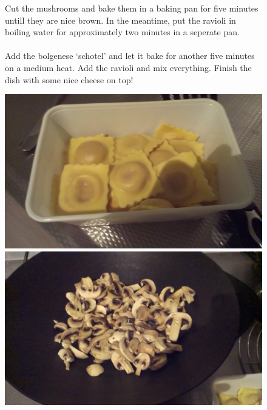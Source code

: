 \documentclass[a4paper,12pt]{report}
\begin{document}
\begin{figure}[h]

\begin{minipage}{0.6\textwidth}
Cut the mushrooms and bake them in a baking pan for five minutes untill they are nice brown. In the meantime, put the ravioli in boiling water for approximately two minutes in a seperate pan.  \\
\\
Add the bolgenese `schotel' and let it bake for another five minutes on a medium heat. Add the ravioli and mix everything. Finish the dish with some nice cheese on top!

\end{minipage}
\begin{minipage}{0.35\textwidth}
	\includegraphics[scale=0.065]{Images/ravioli.jpg}
	\includegraphics[scale=0.065]{Images/mushroom.jpg}
\end{minipage}
\end{figure}
\end{document}
